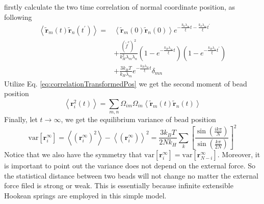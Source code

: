 \documentclass[12pt,a4paper]{article}
\begin{document}
firstly calculate the two time correlation of normal coordinate position, as
following
\begin{equation}
    \begin{aligned}
    \label{eq:correlationTransformedPos}
    \left<\tilde{\mathbf{r}}_m(t)\tilde{\mathbf{r}}_n(t^{\prime})\right> = &
    \left<\tilde{\mathbf{r}}_m(0)\tilde{\mathbf{r}}_n(0)\right>
    e^{-\frac{k_h\lambda_m}{\xi}t-\frac{k_h\lambda_m}{\xi}t^{\prime}}  \\
    & + \frac{(\tilde{f}^e)^2}{k_H^2\lambda_m\lambda_n}
    \left(1 - e^{-\frac{k_H\lambda_m}{\xi} t} \right)
    \left(1 - e^{-\frac{k_H\lambda_n}{\xi} t^{\prime}} \right) \\
    & + \frac{3k_B T}{k_H\lambda_m}e^{-\frac{k_H\lambda_m}{\xi}t}\delta_{mn} 
    \end{aligned}
\end{equation}
Utilize Eq. \eqref{eq:correlationTransformedPos} we get the second moment of
bead position
\begin{equation}
    \label{eq:secondMoment}
    \left<\mathbf{r}_i^2(t)\right> = \sum_{m,n}\Omega_{im}\Omega_{in}
    \left<\tilde{\mathbf{r}}_m(t)\tilde{\mathbf{r}}_n(t)\right>
\end{equation}
Finally, let $t\rightarrow\infty$, we get the equilibrium variance of bead
position
\begin{equation}
    \label{eq:beadVariance}
    \text{var}\left[\mathbf{r}_i^{\infty}\right] =
    \left<(\mathbf{r}_i^{\infty})^2\right> - \left<(\mathbf{r}_i^{\infty})\right>^2 
    = \frac{3k_B T}{2 N k_H}\sum_k\left[ \frac{\sin\left(\frac{ik\pi}{N}\right)}
        {\sin\left(\frac{k\pi}{2N}\right)} \right]^2
\end{equation}
Notice that we also have the symmetry that
$\text{var}\left[\mathbf{r}_i^{\infty}\right] =
\text{var}\left[\mathbf{r}_{N-i}^{\infty}\right]$. Moreover, it is important to
point out the variance does not depend on the external force. So the statistical
distance between two beads will not change no matter the external force filed is
strong or weak. This is essentially because infinite extensible Hookean springs
are employed in this simple model. 
\end{document}
